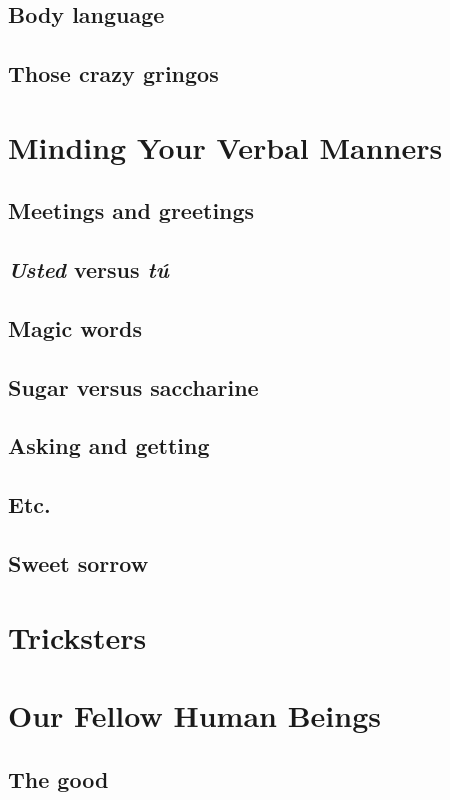 \section{Body language}
\section{Those crazy gringos}

\chapter{Minding Your Verbal Manners}

\section{Meetings and greetings}
\section{\textit{Usted} versus \textit{tú}}
\section{Magic words}
\section{Sugar versus saccharine}
\section{Asking and getting}
\section{Etc.}
\section{Sweet sorrow}

\chapter{Tricksters}

\chapter{Our Fellow Human Beings}

\section{The good}

